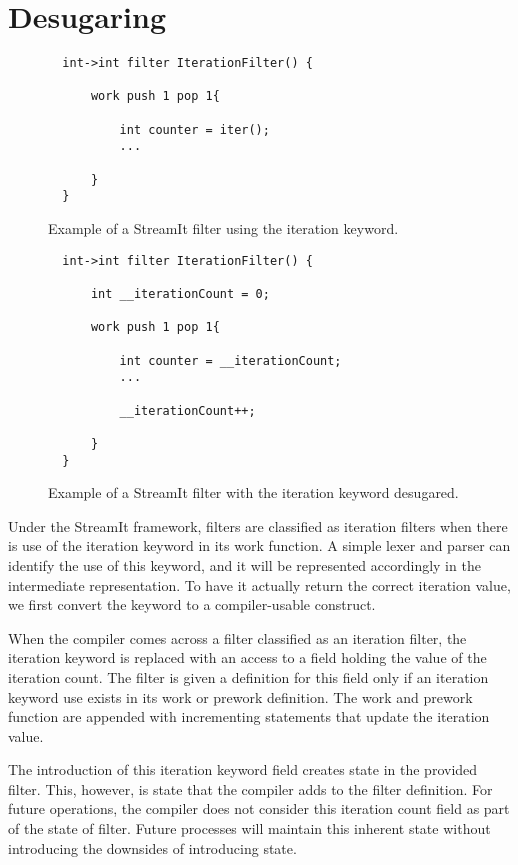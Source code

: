 \section{Desugaring}

\begin{figure}[t]
{\eightpoint
\begin{verbatim}
  int->int filter IterationFilter() {

      work push 1 pop 1{

          int counter = iter();
          ...

      }
  }
\end{verbatim}
\caption{Example of a StreamIt filter using the iteration keyword.\protect\label{fig:iter-filter-example}}}
\end{figure}


\begin{figure}[t]
{\eightpoint	
\begin{verbatim}
  int->int filter IterationFilter() {

      int __iterationCount = 0;      

      work push 1 pop 1{

          int counter = __iterationCount;
          ...

          __iterationCount++;

      }
  }
\end{verbatim}
\caption{Example of a StreamIt filter with the iteration keyword desugared.\protect\label{fig:desugar-filter-example}}}
\end{figure}


Under the StreamIt framework, filters are classified as iteration filters when there is use of the iteration keyword in its work function.  A simple lexer and parser can identify the use of this keyword, and it will be represented accordingly in the intermediate representation.  To have it actually return the correct iteration value, we first convert the keyword to a compiler-usable construct.

When the compiler comes across a filter classified as an iteration filter, the iteration keyword is replaced with an access to a field holding the value of the iteration count.  The filter is given a definition for this field only if an iteration keyword use exists in its work or prework definition.  The work and prework function are appended with incrementing statements that update the iteration value.

The introduction of this iteration keyword field creates state in the provided filter.  This, however, is state that the compiler adds to the filter definition.  For future operations, the compiler does not consider this iteration count field as part of the state of filter.  Future processes will maintain this inherent state without introducing the downsides of introducing state.

